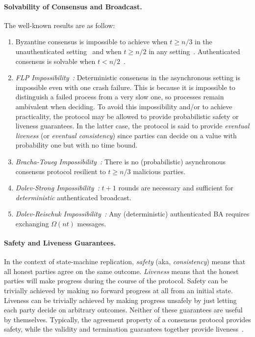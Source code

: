 \documentclass[11pt]{article}
\theoremstyle{mytheoremstyle}
\begin{document}
\paragraph{Solvability of Consensus and Broadcast.} The well-known results are as follow:
\begin{enumerate}
	\item Byzantine consensus is impossible to achieve when $t \geq n/3$ in the unauthenticated setting~\cite{lsp82} and when $t \geq n/2$ in any setting~\cite{fitzi2003}. Authenticated consensus is solvable when $t<n/2$~\cite{lsp82}.
	
	\item \emph{FLP Impossibility~\cite{FLP}:} Deterministic consensus in the asynchronous setting is impossible even with one crash failure. This is because it is impossible to distinguish a failed process from a very slow one, so processes remain ambivalent when deciding. To avoid this impossibility and/or to achieve practicality, the protocol may be allowed to provide probabilistic safety or liveness guarantees. In the latter case, the protocol is said to provide \emph{eventual liveness} (or \emph{eventual consistency}) since parties can decide on a value with probability one but with no time bound.
	
	\item \emph{Bracha-Toueg Impossibility~\cite{Bracha:Toueg:1983}:} There is no (probabilistic) asynchronous consensus protocol resilient to $t \geq n/3$ malicious parties.
	
	\item \emph{Dolev-Strong Impossibility~\cite{dolev:strong:83}:} $t + 1$ rounds are necessary and sufficient for \emph{deterministic} authenticated broadcast.
	
	\item \emph{Dolev-Reischuk Impossibility~\cite{dolev:reischuk:82}:} Any (deterministic) authenticated BA requires exchanging $\Omega(nt)$ messages.
\end{enumerate}

\paragraph{Safety and Liveness Guarantees.} In the context of state-machine replication, \emph{safety} (aka, \emph{consistency}) means that all honest parties agree on the same outcome. \emph{Liveness} means that the honest parties will make progress during the course of the protocol. Safety can be trivially achieved by making no forward progress at all from an initial state. Liveness can be trivially achieved by making progress unsafely by just letting each party decide on arbitrary outcomes. Neither of these guarantees are useful by themselves. Typically, the agreement property of a consensus protocol provides safety, while the validity and termination guarantees together provide liveness~\cite{cryptoeprint:2018:754}.
\end{document}

